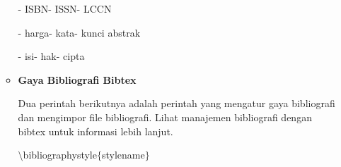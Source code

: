 \begin{itemize}
\begin{itemize}
\hspace*{0.3in}- ISBN\hspace*{0.4in}\hspace*{0.3in}- ISSN\hspace*{0.3in}\hspace*{0.4in}- LCCN\par

\hspace*{0.3in}- harga\hspace*{0.3in}\hspace*{0.4in}- kata\hspace*{0.4in}\hspace*{0.3in}- kunci abstrak\par

\hspace*{0.3in}- isi\hspace*{0.6in}\hspace*{0.3in}- hak\hspace*{0.3in}\hspace*{0.4in}- cipta\par

\vspace{\baselineskip}
\vspace{\baselineskip}
	\item {\fontsize{14pt}{14pt}\selectfont \textbf{Gaya Bibliografi Bibtex}}\par
\vspace{\baselineskip}
Dua perintah berikutnya adalah perintah yang mengatur gaya bibliografi dan mengimpor file bibliografi. Lihat manajemen bibliografi dengan bibtex untuk informasi lebih lanjut. \par
\vspace{\baselineskip}
$\setminus$bibliographystyle$ \{ $stylename$ \} $\par


\end{itemize}
\end{itemize}
